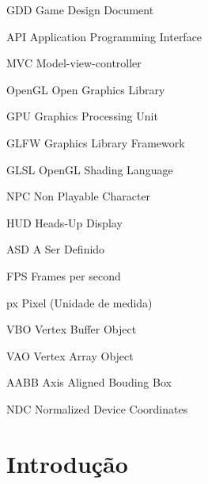 \documentclass[12pt, 
openright, 
oneside, 
a4paper,    
brazil]{facom-ufu-abntex2}
\begin{document}
\begin{siglas} 
  \item[GDD] Game Design Document 
  \item[API] Application Programming Interface
  \item[MVC] Model-view-controller
  \item[OpenGL] Open Graphics Library
  \item[GPU] Graphics Processing Unit
  \item[GLFW] Graphics Library Framework
  \item[GLSL] OpenGL Shading Language
  \item[NPC] Non Playable Character
  \item[HUD] Heads-Up Display
  \item[ASD] A Ser Definido
  \item[FPS] Frames per second
  \item[px] Pixel (Unidade de medida)
  \item[VBO] Vertex Buffer Object
  \item[VAO] Vertex Array Object
  \item[AABB] Axis Aligned Bouding Box
  \item[NDC] Normalized Device Coordinates
\end{siglas}


\tableofcontents*
\cleardoublepage






\chapter{Introdução}
\end{document}
